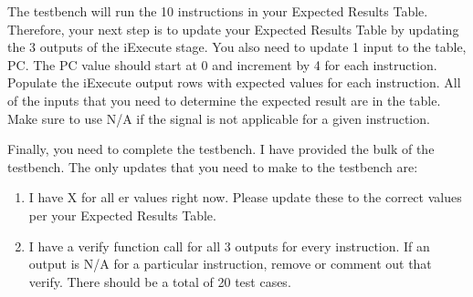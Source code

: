The testbench will run the 10 instructions in your Expected Results Table.  Therefore, your next step is to update your Expected Results Table by updating the 3 outputs of the iExecute stage. You also need to update 1 input to the table, PC.  The PC value should start at 0 and increment by 4 for each instruction.  Populate the iExecute output rows with expected values for each instruction.  All of the inputs that you need to determine the expected result are in the table.  Make sure to use N/A if the signal is not applicable for a given instruction.

Finally, you need to complete the testbench.  I have provided the bulk of the testbench.  The only updates that you need to make to the testbench are:
\begin{enumerate}
	\item I have X for all er values right now.  Please update these to the correct values per your Expected Results Table.
	\item I have a verify function call for all 3 outputs for every instruction.  If an output is N/A for a particular instruction, remove or comment out that verify.  There should be a total of 20 test cases.  
\end{enumerate}   


